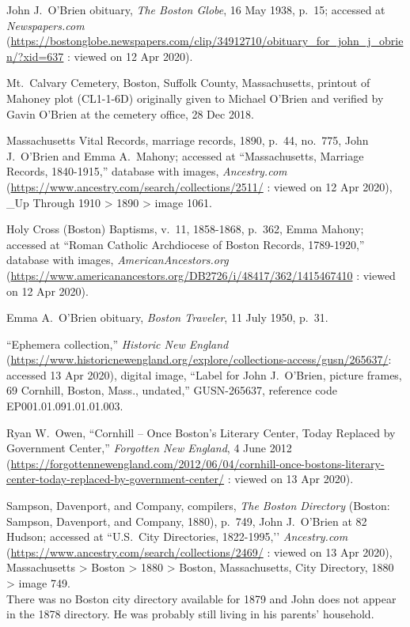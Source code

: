 \begin{thebibliography}{999}
	John J.\ O'Brien obituary, \textit{The Boston Globe}, 16 May 1938, p.\ 15; accessed at \textit{Newspapers.com} (\url{https://bostonglobe.newspapers.com/clip/34912710/obituary_for_john_j_obrien/?xid=637} : viewed on 12 Apr 2020).
	
	Mt.\ Calvary Cemetery, Boston, Suffolk County, Massachusetts, printout of Mahoney plot (CL1-1-6D) originally given to Michael O'Brien and verified by Gavin O'Brien at the cemetery office, 28 Dec 2018.
	
	Massachusetts Vital Records, marriage records, 1890, p.\ 44, no.\ 775, John J.\ O'Brien and Emma A.\ Mahony; accessed at ``Massachusetts, Marriage Records, 1840-1915,'' database with images, \textit{Ancestry.com} (\url{https://www.ancestry.com/search/collections/2511/} : viewed on 12 Apr 2020), \_Up Through 1910 > 1890 > image 1061.
	
	Holy Cross (Boston) Baptisms, v.\ 11, 1858-1868, p.\ 362, Emma Mahony; accessed at ``Roman Catholic Archdiocese of Boston Records, 1789-1920,'' database with images, \textit{AmericanAncestors.org} (\url{https://www.americanancestors.org/DB2726/i/48417/362/1415467410} : viewed on 12 Apr 2020).
	
	Emma A.\ O'Brien obituary, \textit{Boston Traveler}, 11 July 1950, p.\ 31.
	
	``Ephemera collection,'' \textit{Historic New England} (\url{https://www.historicnewengland.org/explore/collections-access/gusn/265637/}: accessed 13 Apr 2020), digital image, ``Label for John J.\ O'Brien, picture frames, 69 Cornhill, Boston, Mass., undated,'' GUSN-265637, reference code EP001.01.091.01.01.003.
	
	Ryan W.\ Owen, ``Cornhill -- Once Boston’s Literary Center, Today Replaced by Government Center,'' \textit{Forgotten New England}, 4 June 2012 (\url{https://forgottennewengland.com/2012/06/04/cornhill-once-bostons-literary-center-today-replaced-by-government-center/} : viewed on 13 Apr 2020).
	
	Sampson, Davenport, and Company, compilers, \textit{The Boston Directory} (Boston: Sampson, Davenport, and Company, 1880), p.\ 749, John J.\ O'Brien at 82 Hudson; accessed at ``U.S.\ City Directories, 1822-1995,’’ \textit{Ancestry.com} (\url{https://www.ancestry.com/search/collections/2469/} : viewed on 13 Apr 2020), Massachusetts > Boston > 1880 > Boston, Massachusetts, City Directory, 1880 > image 749.\\
	There was no Boston city directory available for 1879 and John does not appear in the 1878 directory. He was probably still living in his parents' household.
	

\end{thebibliography}
